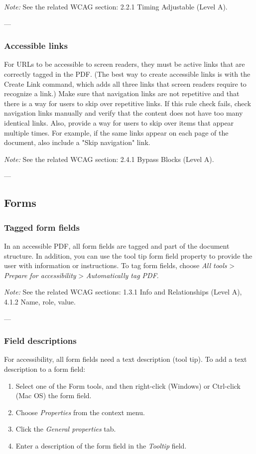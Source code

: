 \vspace{0.5em}
\noindent\textit{Note:} See the related WCAG section: 2.2.1 Timing Adjustable (Level A)\cite{WCAG}.

---

\subsubsection{Accessible links}
For URLs to be accessible to screen readers, they must be active links that are correctly tagged in the PDF. (The best way to create accessible links is with the Create Link command, which adds all three links that screen readers require to recognize a link.) Make sure that navigation links are not repetitive and that there is a way for users to skip over repetitive links\cite{AdobeHelpX}.
If this rule check fails, check navigation links manually and verify that the content does not have too many identical links. Also, provide a way for users to skip over items that appear multiple times. For example, if the same links appear on each page of the document, also include a "Skip navigation" link.

\vspace{0.5em}
\noindent\textit{Note:} See the related WCAG section: 2.4.1 Bypass Blocks (Level A)\cite{WCAG}.

---

\subsection{Forms}
\subsubsection{Tagged form fields}
In an accessible PDF, all form fields are tagged and part of the document structure. In addition, you can use the tool tip form field property to provide the user with information or instructions\cite{AdobeHelpX}.
To tag form fields, choose \emph{All tools} > \emph{Prepare for accessibility} > \emph{Automatically tag PDF}.

\vspace{0.5em}
\noindent\textit{Note:} See the related WCAG sections: 1.3.1 Info and Relationships (Level A), 4.1.2 Name, role, value\cite{WCAG}.

---

\subsubsection{Field descriptions}
For accessibility, all form fields need a text description (tool tip)\cite{AdobeHelpX}.
To add a text description to a form field:
\begin{enumerate}
    \item Select one of the Form tools, and then right-click (Windows) or Ctrl-click (Mac OS) the form field.
    \item Choose \emph{Properties} from the context menu.
    \item Click the \emph{General properties} tab.
    \item Enter a description of the form field in the \emph{Tooltip} field.
\end{enumerate}

